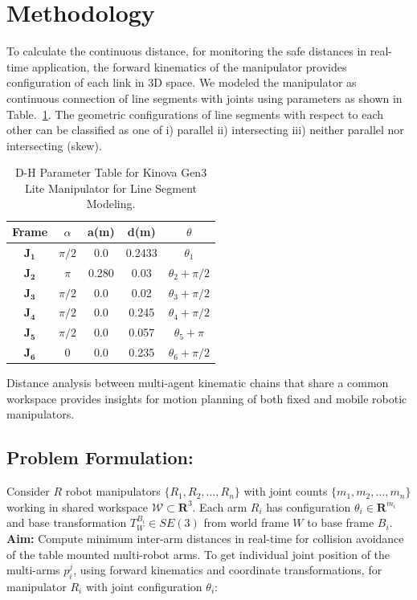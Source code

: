 \documentclass[10pt,twocolumn]{ICCAS}
\begin{document}
\section{Methodology}
\label{method}
To calculate the continuous distance, for monitoring the safe distances in real-time application, the forward kinematics of the manipulator provides configuration of each link in 3D space\cite{K.lynch}. We modeled the manipulator as continuous connection of line segments with joints using parameters as shown in Table.~\ref{tab:dh-table}. The geometric configurations of line segments with respect to each other can be classified as one of i) parallel ii) intersecting iii) neither parallel nor intersecting (skew).
\begin{table}[htbp]
    \centering
    \begin{tabular}{ccccc}
        \hline
        Frame & $\alpha$ & a(m) &d(m)  &$\theta$ \\
        \hline\hline
         $\mathbf{J_{1}}$ &  $\pi/2$&  0.0&  0.2433& $\theta_{1}$\\
         $\mathbf{J_{2}}$ &  $\pi$&  0.280&  0.03&$\theta_{2}+\pi/2$ \\
         $\mathbf{J_{3}}$ &  $\pi/2$&  0.0&  0.02& $\theta_{3}+\pi/2$\\
         $\mathbf{J_{4}}$ &  $\pi/2$&  0.0&  0.245&$\theta_{4}+\pi/2$ \\
         $\mathbf{J_{5}}$ &  $\pi/2$&  0.0&  0.057&$\theta_{5}+\pi$ \\
         $\mathbf{J_{6}}$ &  0&  0.0&  0.235&$\theta_{6}+\pi/2$ \\
         \hline
    \end{tabular}
    \caption{D-H Parameter Table for Kinova Gen3 Lite Manipulator for Line Segment Modeling.}
    \label{tab:dh-table}
\end{table}
Distance analysis between multi-agent kinematic chains that share a common workspace provides insights for motion planning of both fixed and mobile robotic manipulators. 
\subsection{Problem Formulation:}
\label{derivation}
Consider $R$ robot manipulators $\{R_1, R_2, ..., R_n\}$ with joint counts $\{m_1, m_2, ..., m_n\}$ working in shared workspace $\mathcal{W} \subset \mathbf{R}^3$. Each arm $R_i$ has configuration $\theta_i \in \mathbf{R}^{m_i}$ and base transformation $T_W^{B_i} \in SE(3)$ from world frame $W$ to base frame $B_i$.\newline
\noindent\textbf{Aim:} Compute minimum inter-arm distances in real-time for collision avoidance of the table mounted multi-robot arms.\newline
To get individual joint position of the multi-arms $p_i^j$, using forward kinematics and coordinate transformations, for manipulator $R_i$ with joint configuration $\theta_i$:
\end{document}
